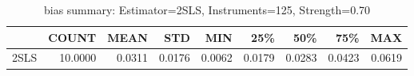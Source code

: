 \begin{table}[ht]
\centering
\caption{bias summary: Estimator=2SLS, Instruments=125, Strength=0.70}
\begin{tabular}{lrrrrrrrr}
\toprule
 & COUNT & MEAN & STD & MIN & 25\% & 50\% & 75\% & MAX \\
\midrule
2SLS & 10.0000 & 0.0311 & 0.0176 & 0.0062 & 0.0179 & 0.0283 & 0.0423 & 0.0619 \\
\bottomrule
\end{tabular}
\end{table}
